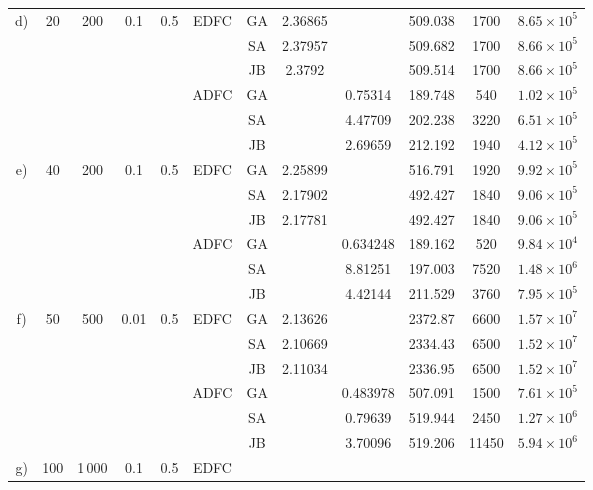 \begin{tabular}{c c c c c c c c c c c c}
\cmidrule{2-12}
\multirow{6}{*}{d)} & \multirow{6}{*}{20} & \multirow{6}{*}{200} & \multirow{6}{*}{0.1} & \multirow{6}{*}{0.5}
  & \multirow{3}{*}{EDFC}
     & GA & 2.36865 &  & 509.038 & 1700 & $8.65 \times 10^{5}$ \\
&&&&&& SA & 2.37957 &  & 509.682 & 1700 & $8.66 \times 10^{5}$ \\
&&&&&& JB & 2.3792 &  & 509.514 & 1700 & $8.66 \times 10^{5}$ \\
  &&&&& \multirow{3}{*}{ADFC}
     & GA &  & 0.75314 & 189.748 & 540 & $1.02 \times 10^{5}$ \\
&&&&&& SA &  & 4.47709 & 202.238 & 3220 & $6.51 \times 10^{5}$ \\
&&&&&& JB &  & 2.69659 & 212.192 & 1940 & $4.12 \times 10^{5}$ \\
\cmidrule{2-12}
\multirow{6}{*}{e)} & \multirow{6}{*}{40} & \multirow{6}{*}{200} & \multirow{6}{*}{0.1} & \multirow{6}{*}{0.5}
  & \multirow{3}{*}{EDFC}
     & GA & 2.25899 &  & 516.791 & 1920 & $9.92 \times 10^{5}$ \\
&&&&&& SA & 2.17902 &  & 492.427 & 1840 & $9.06 \times 10^{5}$ \\
&&&&&& JB & 2.17781 &  & 492.427 & 1840 & $9.06 \times 10^{5}$ \\
  &&&&& \multirow{3}{*}{ADFC}
     & GA &  & 0.634248 & 189.162 & 520 & $9.84 \times 10^{4}$ \\
&&&&&& SA &  & 8.81251 & 197.003 & 7520 & $1.48 \times 10^{6}$ \\
&&&&&& JB &  & 4.42144 & 211.529 & 3760 & $7.95 \times 10^{5}$ \\
\cmidrule{2-12}
\multirow{6}{*}{f)} & \multirow{6}{*}{50} & \multirow{6}{*}{500} & \multirow{6}{*}{0.01} & \multirow{6}{*}{0.5}
  & \multirow{3}{*}{EDFC}
     & GA & 2.13626 &  & 2372.87 & 6600 & $1.57 \times 10^{7}$ \\
&&&&&& SA & 2.10669 &  & 2334.43 & 6500 & $1.52 \times 10^{7}$ \\
&&&&&& JB & 2.11034 &  & 2336.95 & 6500 & $1.52 \times 10^{7}$ \\
  &&&&& \multirow{3}{*}{ADFC}
     & GA &  & 0.483978 & 507.091 & 1500 & $7.61 \times 10^{5}$ \\
&&&&&& SA &  & 0.79639 & 519.944 & 2450 & $1.27 \times 10^{6}$ \\
&&&&&& JB &  & 3.70096 & 519.206 & 11450 & $5.94 \times 10^{6}$ \\
\cmidrule{2-12}
\multirow{6}{*}{g)} & \multirow{6}{*}{100} & \multirow{6}{*}{1\,000} & \multirow{6}{*}{0.1} & \multirow{6}{*}{0.5}
  & \multirow{3}{*}{EDFC}

\end{tabular}
